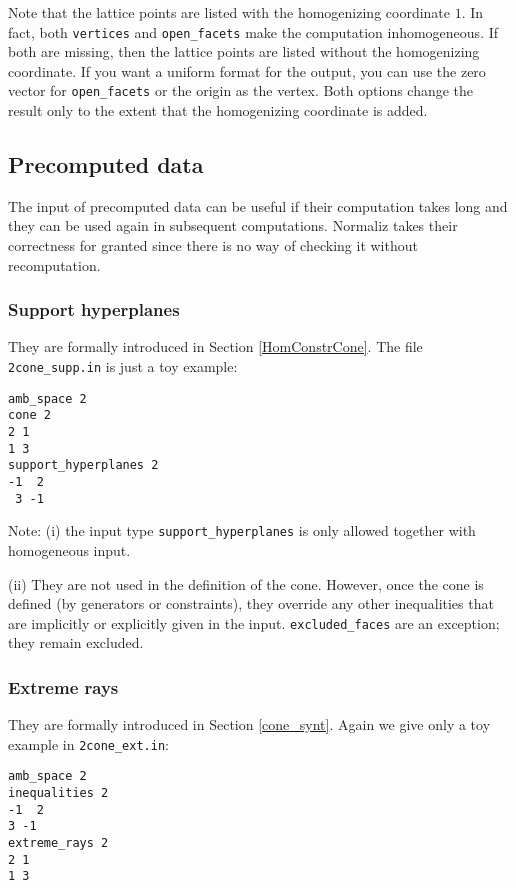 \documentclass[12pt,a4paper]{scrartcl}
\theoremstyle{definition}
\begin{document}
{Note that the lattice points are listed with the homogenizing coordinate $1$. In fact, both \verb|vertices| and \verb|open_facets| make the computation inhomogeneous. If both are missing, then the lattice points are listed without the homogenizing coordinate. If you want a uniform format for the output, you can use the zero vector for \verb|open_facets| or the origin as the vertex. Both options change the result only to the extent that the homogenizing coordinate is added.

\subsection{Precomputed data}

The input of precomputed data can be useful if their computation takes long and they can be used again in subsequent computations. Normaliz takes their correctness for granted since there is no way of checking it without recomputation.

\subsubsection{Support hyperplanes}\label{supphyp_ex}

They are formally introduced in Section \ref{HomConstrCone}.
The file \verb|2cone_supp.in| is just a toy example:
\begin{Verbatim}
amb_space 2
cone 2
2 1
1 3
support_hyperplanes 2
-1  2
 3 -1
\end{Verbatim}

Note: (i) the input type \verb|support_hyperplanes| is only allowed together with homogeneous input.

(ii) They are not used in the definition of the cone. However, once the cone is defined (by generators or constraints), they override any other inequalities that are implicitly or explicitly given in the input. \verb|excluded_faces| are an exception; they remain excluded.

\subsubsection{Extreme rays} \label{extrays_ex}

They are formally introduced in Section \ref{cone_synt}. Again we give only a toy example in \verb|2cone_ext.in|:
\begin{Verbatim}
amb_space 2
inequalities 2
-1  2
3 -1
extreme_rays 2
2 1
1 3
\end{Verbatim}

}
\end{document}
